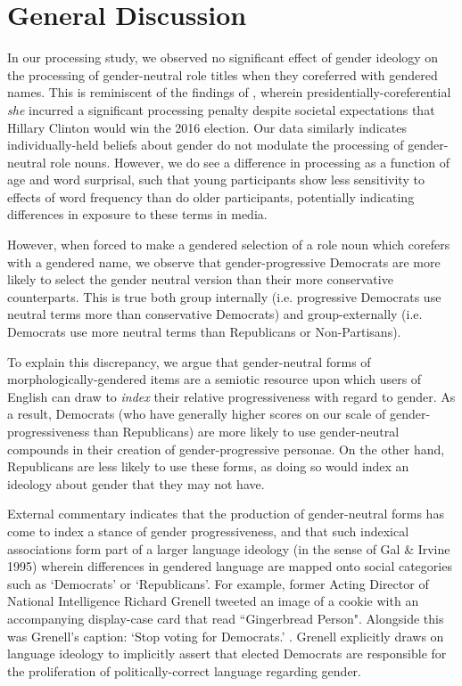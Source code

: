 \documentclass[10pt,letterpaper]{article}
\begin{document}
	\section{General Discussion}
	 In our processing study, we observed no significant effect of gender ideology on the processing of gender-neutral role titles when they coreferred with gendered names. This is reminiscent of the findings of \textcite{von2020implicit}, wherein presidentially-coreferential \textit{she} incurred a significant processing penalty despite societal expectations that Hillary Clinton would win the 2016 election. Our data similarly indicates individually-held beliefs about gender do not modulate the processing of gender-neutral role nouns. However, we do see a difference in processing as a function of age and word surprisal, such that young participants show less sensitivity to effects of word frequency than do older participants, potentially indicating differences in exposure to these terms in media.\par 
	 However, when forced to make a gendered selection of a role noun which corefers with a gendered name, we observe that gender-progressive Democrats are more likely to select the gender neutral version than their more conservative counterparts. This is true both group internally (i.e. progressive Democrats use neutral terms more than conservative Democrats) and group-externally (i.e. Democrats use more neutral terms than Republicans or Non-Partisans). \par 
	To explain this discrepancy, we argue that gender-neutral forms of morphologically-gendered items are a semiotic resource upon which users of English can draw to \textit{index} \parencite{eckert2008variation} their relative progressiveness with regard to gender. As a result, Democrats (who have generally higher scores on our scale of gender-progressiveness than Republicans) are more likely to use gender-neutral compounds in their creation of gender-progressive personae. On the other hand, Republicans are less likely to use these forms, as doing so would index an ideology about gender that they may not have. \par 
	External commentary indicates that the production of gender-neutral forms has come to index a stance of gender progressiveness, and that such indexical associations form part of a larger language ideology (in the sense of Gal \& Irvine 1995) wherein differences in gendered language are mapped onto social categories such as `Democrats' or `Republicans'. For example, former Acting Director of National Intelligence Richard Grenell tweeted an image of a cookie with an accompanying display-case card that read ``Gingerbread Person". Alongside this was Grenell's caption: `Stop voting for Democrats.' \parencite{Grenell}. Grenell explicitly draws on language ideology to implicitly assert that elected Democrats are responsible for the proliferation of politically-correct language regarding gender. \par 
\end{document}
